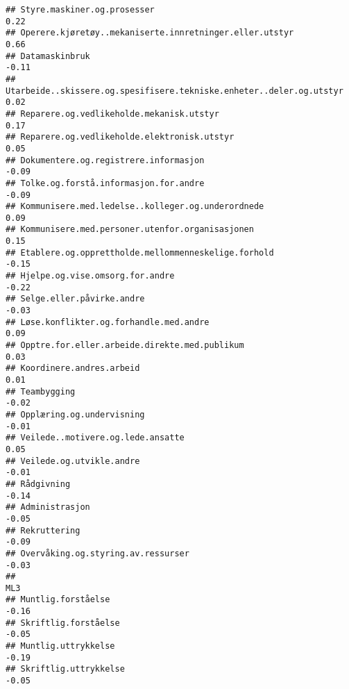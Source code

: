 \documentclass[
]{article}
\begin{document}
\begin{verbatim}
## Styre.maskiner.og.prosesser                                                       0.22
## Operere.kjøretøy..mekaniserte.innretninger.eller.utstyr                           0.66
## Datamaskinbruk                                                                   -0.11
## Utarbeide..skissere.og.spesifisere.tekniske.enheter..deler.og.utstyr              0.02
## Reparere.og.vedlikeholde.mekanisk.utstyr                                          0.17
## Reparere.og.vedlikeholde.elektronisk.utstyr                                       0.05
## Dokumentere.og.registrere.informasjon                                            -0.09
## Tolke.og.forstå.informasjon.for.andre                                            -0.09
## Kommunisere.med.ledelse..kolleger.og.underordnede                                 0.09
## Kommunisere.med.personer.utenfor.organisasjonen                                   0.15
## Etablere.og.opprettholde.mellommenneskelige.forhold                              -0.15
## Hjelpe.og.vise.omsorg.for.andre                                                  -0.22
## Selge.eller.påvirke.andre                                                        -0.03
## Løse.konflikter.og.forhandle.med.andre                                            0.09
## Opptre.for.eller.arbeide.direkte.med.publikum                                     0.03
## Koordinere.andres.arbeid                                                          0.01
## Teambygging                                                                      -0.02
## Opplæring.og.undervisning                                                        -0.01
## Veilede..motivere.og.lede.ansatte                                                 0.05
## Veilede.og.utvikle.andre                                                         -0.01
## Rådgivning                                                                       -0.14
## Administrasjon                                                                   -0.05
## Rekruttering                                                                     -0.09
## Overvåking.og.styring.av.ressurser                                               -0.03
##                                                                                    ML3
## Muntlig.forståelse                                                               -0.16
## Skriftlig.forståelse                                                             -0.05
## Muntlig.uttrykkelse                                                              -0.19
## Skriftlig.uttrykkelse                                                            -0.05

\end{verbatim}
\end{document}
